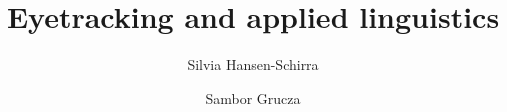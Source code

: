 \title{Eyetracking and applied linguistics}   
\author{Silvia Hansen-Schirra\and \newlineCover Sambor Grucza}
\renewcommand{\lsISBNdigital}{000-0-000000-00-0}
\renewcommand{\lsISBNhardcover}{000-0-000000-00-0}
\renewcommand{\lsISBNsoftcover}{000-0-000000-00-0}
\renewcommand{\lsSeries}{tmnlp}  
\renewcommand{\lsSeriesNumber}{5}
